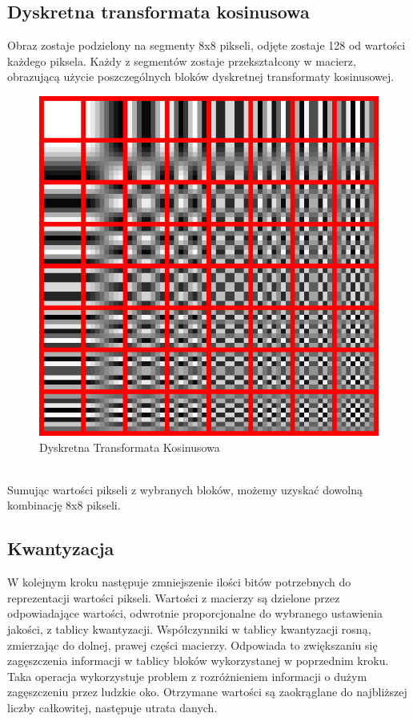 \documentclass[a4paper, 12pt]{article}
\begin{document}
\subsection{Dyskretna transformata kosinusowa}
Obraz zostaje podzielony na segmenty 8x8 pikseli, odjęte zostaje 128 od wartości każdego piksela.
Każdy z segmentów zostaje przekształcony w macierz, obrazującą użycie poszczególnych bloków dyskretnej transformaty kosinusowej.
\begin{figure}[h!]
	\begin{center}
	\includegraphics[width=0.4\columnwidth]{DCT.png}
	\caption{Dyskretna Transformata Kosinusowa}
\end{center}
\end{figure}
\\
Sumując wartości pikseli z wybranych bloków, możemy uzyskać dowolną kombinację 8x8 pikseli.
\subsection{Kwantyzacja}
W kolejnym kroku następuje zmniejszenie ilości bitów potrzebnych do reprezentacji wartości pikseli.
Wartości z macierzy są dzielone przez odpowiadające wartości, odwrotnie proporcjonalne do wybranego ustawienia jakości, z tablicy kwantyzacji.
Współczynniki w tablicy kwantyzacji rosną, zmierzając do dolnej, prawej części macierzy.
Odpowiada to zwiększaniu się zagęszczenia informacji w tablicy bloków wykorzystanej w poprzednim kroku.
Taka operacja wykorzystuje problem z rozróżnieniem informacji o dużym zagęszczeniu przez ludzkie oko.
Otrzymane wartości są zaokrąglane do najbliższej liczby całkowitej, następuje utrata danych.
\end{document}

